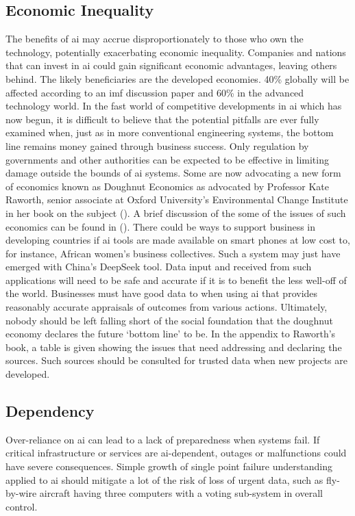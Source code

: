 \subsection{Economic Inequality}
The benefits of \gls{ai} may accrue disproportionately to those who own the technology, potentially exacerbating economic inequality. Companies and nations that can invest in \gls{ai} could gain significant economic advantages, leaving others behind. The likely beneficiaries are the developed economies. 40\% globally will be affected according to an \gls{imf} discussion paper and 60\% in the advanced technology world. In the fast world of competitive developments in \gls{ai} which has now begun,  it is difficult to believe that the potential pitfalls are ever fully examined when, just as in more conventional engineering systems, the bottom line remains money gained through business success. Only regulation by governments and other authorities can be expected to be effective in limiting damage outside the bounds of \gls{ai} systems. Some are now advocating a new form of economics known as Doughnut Economics as advocated by Professor Kate Raworth, senior associate at Oxford University’s Environmental Change Institute in her book on the subject (\cite{citationRaworth2017}). A brief discussion of the some of the issues of such economics can be found in (\cite{citation:SCSC193}). There could be ways to support business in developing countries if \gls{ai} tools are made available on smart phones at low cost to, for instance, African women’s business collectives. Such a system may just have emerged with China's DeepSeek tool. Data input and received from such applications will need to be safe and accurate if it is to benefit the less well-off of the world. Businesses must have good data to when using \gls{ai} that provides reasonably accurate appraisals of outcomes from various actions. Ultimately, nobody should be left falling short of the social foundation that the doughnut economy declares the future ‘bottom line’ to be. In the appendix to Raworth’s book, a table is given showing the issues that need addressing and declaring the sources. Such sources should be consulted for trusted data when new projects are developed. 

\subsection{Dependency}
Over-reliance on \gls{ai} can lead to a lack of preparedness when systems fail. If critical infrastructure or services are \gls{ai}-dependent, outages or malfunctions could have severe consequences. Simple growth of single point failure understanding applied to \gls{ai} should mitigate a lot of the risk of loss of urgent data, such as fly-by-wire aircraft having three computers with a voting sub-system in overall control.

